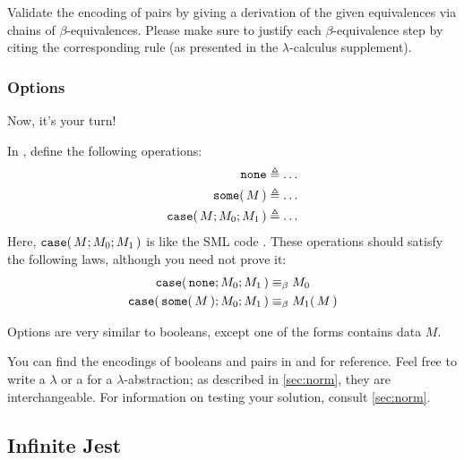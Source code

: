 \documentclass[11pt]{article}
\begin{document}
\begin{task}{10}
  Validate the encoding of pairs by giving a derivation of the given equivalences via chains of $\beta$-equivalences. Please make sure to justify each $\beta$-equivalence step by citing the corresponding rule (as presented in the $\lambda$-calculus supplement).
\end{task}

\subsubsection{Options}

Now, it's your turn!

\begin{task}{15}
  In , define the following operations:
  \begin{align*}
    \mathtt{none}                    &\mathrel{\triangleq} \dots \\
    {\mathtt{some}}\mathtt{(}\,M\,\mathtt{)}         &\mathrel{\triangleq} \dots \\
    {\mathtt{case}}\mathtt{(}\,M;M_0;M_1\,\mathtt{)} &\mathrel{\triangleq} \dots
  \end{align*}
  Here, ${\mathtt{case}}\mathtt{(}\,M;M_0;M_1\,\mathtt{)}$ is like the SML code .
  These operations should satisfy the following laws, although you need not prove it:
  \begin{align*}
    {\ensuremath{\mathtt{case}}}\mathtt{(}\,\mathtt{none}           ;M_0;M_1\,\mathtt{)} &\mathrel{\equiv_\beta} M_0 \\
    {\mathtt{case}}\mathtt{(}\,{\mathtt{some}}\mathtt{(}\,M\,\mathtt{)};M_0;M_1\,\mathtt{)} &\mathrel{\equiv_\beta} {M_1}\mathtt{(}\,M\,\mathtt{)} \\
  \end{align*}
\end{task}
\begin{hint}
  Options are very similar to booleans, except one of the forms contains data $M$.
\end{hint}
You can find the encodings of booleans and pairs in  and  for reference.
Feel free to write a \colorbox{background_color}{$\lambda$} or a \code{\\} for a $\lambda$-abstraction; as described in \cref{sec:norm}, they are interchangeable.
For information on testing your solution, consult \cref{sec:norm}.

\subsection{Infinite Jest}
\end{document}
